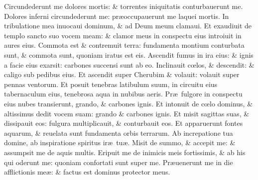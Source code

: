 \documentclass[a5paper,10pt]{book}
\def\ae{æ}
\def\oe{œ}
\begin{document}
\begin{multicols*}{2}
\newline \color{red} C\color{black}ircundederunt me dolores mortis: \& torrentes iniquitatis conturbauerunt me.
\newline \color{red} D\color{black}olores inferni circundederunt me: pr\ae occupauerunt me laquei mortis.
\newline \color{red} I\color{black}n tribulatione mea inuocaui dominum, \& ad Deum meum clamaui.
\newline \color{red} E\color{black}t exaudiuit de templo sancto suo vocem meam: \& clamor meus in conspectu eius introiuit in aures eius.
\newline \color{red} C\color{black}ommota est \& contremuit terra: fundamenta montium conturbata sunt, \& commota sunt, quoniam iratus est eis.
\newline \color{red} A\color{black}scendit fumus in ira eius: \& ignis a facie eius exarsit: carbones succensi sunt ab eo.
\newline \color{red} I\color{black}nclinauit c\oe los, \& descendit: \& caligo sub pedibus eius.
\newline \color{red} E\color{black}t ascendit super Cherubim \& volauit: volauit super pennas ventorum.
\newline \color{red} E\color{black}t posuit tenebras latibulum suum, in circuitu eius tabernaculum eius, tenebrosa aqua in nubibus aeris.
\newline \color{red} P\color{black}r\ae \ fulgore in conspectu eius nubes transierunt, grando, \& carbones ignis.
\newline \color{red} E\color{black}t intonuit de c\oe lo dominus, \& altissimus dedit vocem suam: grando \& carbones ignis.
\newline \color{red} E\color{black}t misit sagittas suas, \& dissipauit eos: fulgura multiplicauit, \& conturbauit eos.
\newline \color{red} E\color{black}t apparuerunt fontes aquarum, \& reuelata sunt fundamenta orbis terrarum.
\newline \color{red} A\color{black}b increpatione tua domine, ab inspiratione spiritus ir\ae \ tu\ae .
\newline \color{red} M\color{black}isit de summo, \& accepit me: \& assumpsit me de aquis multis.
\newline \color{red} E\color{black}ripuit me de inimicis meis fortissimis, \& ab his qui oderunt me: quoniam confortati sunt super me.
\newline \color{red} P\color{black}r\ae uenerunt me in die afflictionis me\ae : \& factus est dominus protector meus.

\end{multicols*}
\end{document}
